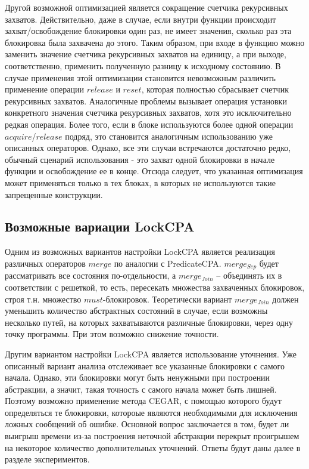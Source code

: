 Другой возможной оптимизацией является сокращение счетчика рекурсивных захватов.
Действительно, даже в случае, если внутри функции происходит захват/освобождение блокировки один раз, не имеет значения, сколько раз эта блокировка была захвачена до этого. 
Таким образом, при входе в функцию можно заменить значение счетчика рекурсивных захватов на единицу, а при выходе, соответственно, применить полученную разницу к исходному состоянию.
В случае применения этой оптимизации становится невозможным различить применение операции $release$ и $reset$, которая полностью сбрасывает счетчик рекурсивных захватов. 
Аналогичные проблемы вызывает операция установки конкретного значения счетчика рекурсивных захватов, хотя это исключительно редкая операция.
Более того, если в блоке используются более одной операции $acquire$/$release$ подряд, это становится аналогичным использованию уже описанных операторов.
Однако, все эти случаи встречаются достаточно редко, обычный сценарий использования - это захват одной блокировки в начале функции и освобождение ее в конце.
Отсюда следует, что указанная оптимизация может применяться только в тех блоках, в которых не используются такие запрещенные конструкции.

\subsection{Возможные вариации LockCPA}
\label{subsect_lock_merge}

Одним из возможных вариантов настройки LockCPA является реализация различных операторов $merge$ по аналогии с PredicateCPA.
$merge_{Sep}$ будет рассматривать все состояния по-отдельности, а $merge_{Join}$ -- объединять их в соответствии с решеткой, то есть, пересекать множества захваченных блокировок, строя т.н. множество $must$-блокировок.
Теоретически вариант $merge_{Join}$ должен уменьшить количество абстрактных состояний в случае, если возможны несколько путей, на которых захватываются различные блокировки, через одну точку программы.
При этом возможно снижение точности. 

Другим вариантом настройки LockCPA является использование уточнения.
Уже описанный вариант анализа отслеживает все указанные блокировки с самого начала. Однако, эти блокировки могут быть ненужными при построении абстракции, а значит, такая точность с самого начала может быть лишней.
Поэтому возможно применение метода CEGAR, с помощью которого будут определяться те блокировки, котороые являются необходимыми для исключения ложных сообщений об ошибке.
Основной вопрос заключается в том, будет ли выигрыш времени из-за построения неточной абстракции перекрыт проигрышем на некоторое количество дополнительных уточнений.
Ответы будут даны далее в разделе экспериментов.

